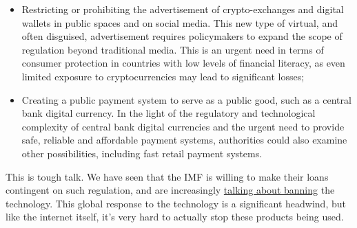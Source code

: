 \begin{itemize}
{\begin{itemize}
\begin{itemize}
\item Ban regulated financial institutions from holding stablecoins and cryptocurrencies or offering related products to clients;
\item Regulate decentralized finance (such finance may, in fact, not be fully decentralized, given its central management and ownership, which form an entry point for regulation);
\end{itemize}
\item Restricting or prohibiting the advertisement of crypto-exchanges and digital wallets in public spaces and on social media. This new type of virtual, and often disguised, advertisement requires policymakers to expand the scope of regulation beyond traditional media. This is an urgent need in terms of consumer protection in countries with low levels of financial literacy, as even limited exposure to cryptocurrencies may lead to significant losses;
\item Creating a public payment system to serve as a public good, such as a central bank digital currency. In the light of the regulatory and technological complexity of central bank digital currencies and the urgent need to provide safe, reliable and affordable payment systems, authorities could also examine other possibilities, including fast retail payment systems.
\end{itemize}
}
This is tough talk. We have seen that the IMF is willing to make their loans contingent on such regulation, and are increasingly \href{https://www.imf.org/en/News/Articles/2023/02/23/pr2351-imf-executive-board-discusses-elements-of-effective-policies-for-crypto-assets}{talking about banning} the technology. This global response to the technology is a significant headwind, but like the internet itself, it's very hard to actually stop these products being used.

\end{itemize}
